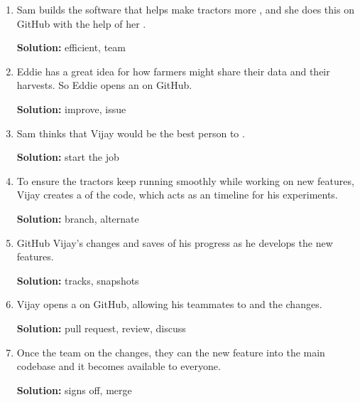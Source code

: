 \documentclass[a4paper,12pt]{article}
\begin{document}
\begin{enumerate}
    \item Sam builds the software that helps make tractors more \underline{\hspace{3cm}}, and she does this on GitHub with the help of her \underline{\hspace{3cm}}.
    
    \textbf{Solution:} efficient, team
    
    \item Eddie has a great idea for how farmers might share their data and \underline{\hspace{3cm}} their harvests. So Eddie opens an \underline{\hspace{3cm}} on GitHub.
    
    \textbf{Solution:} improve, issue
    
    \item Sam thinks that Vijay would be the best person to \underline{\hspace{3cm}}.
    
    \textbf{Solution:} start the job
    
    \item To ensure the tractors keep running smoothly while working on new features, Vijay creates a \underline{\hspace{3cm}} of the code, which acts as an \underline{\hspace{3cm}} timeline for his experiments.
    
    \textbf{Solution:} branch, alternate
    
    \item GitHub \underline{\hspace{3cm}} Vijay's changes and saves \underline{\hspace{3cm}} of his progress as he develops the new features.
    
    \textbf{Solution:} tracks, snapshots
    
    \item Vijay opens a \underline{\hspace{3cm}} on GitHub, allowing his teammates to \underline{\hspace{3cm}} and \underline{\hspace{3cm}} the changes.
    
    \textbf{Solution:} pull request, review, discuss
    
    \item Once the team \underline{\hspace{3cm}} on the changes, they can \underline{\hspace{3cm}} the new feature into the main codebase and it becomes available to everyone.
    
    \textbf{Solution:} signs off, merge
\end{enumerate}
\end{document}

